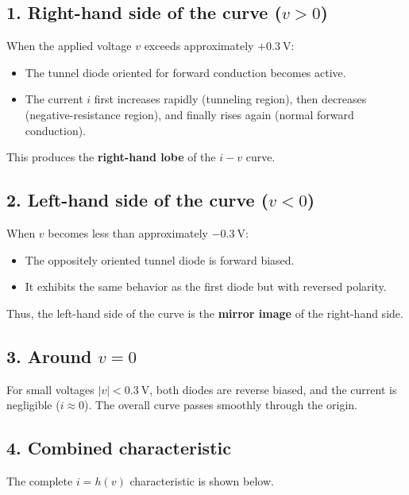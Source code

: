 \documentclass{article}
\begin{document}
\subsection*{1. Right-hand side of the curve (\(v > 0\))}
When the applied voltage \(v\) exceeds approximately \(+0.3~\text{V}\):
\begin{itemize}
    \item The tunnel diode oriented for forward conduction becomes active.
    \item The current \(i\) first increases rapidly (tunneling region), 
          then decreases (negative-resistance region),
          and finally rises again (normal forward conduction).
\end{itemize}
This produces the \textbf{right-hand lobe} of the \(i\!-\!v\) curve.

\subsection*{2. Left-hand side of the curve (\(v < 0\))}
When \(v\) becomes less than approximately \(-0.3~\text{V}\):
\begin{itemize}
    \item The oppositely oriented tunnel diode is forward biased.
    \item It exhibits the same behavior as the first diode but with reversed polarity.
\end{itemize}
Thus, the left-hand side of the curve is the \textbf{mirror image} of the right-hand side.

\subsection*{3. Around \(v = 0\)}
For small voltages \(|v| < 0.3~\text{V}\), both diodes are reverse biased,
and the current is negligible (\(i \approx 0\)).
The overall curve passes smoothly through the origin.

\subsection*{4. Combined characteristic}
The complete \(i = h(v)\) characteristic is shown below.
\end{document}
